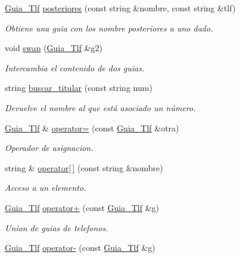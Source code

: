 \begin{DoxyCompactItemize}
\hyperlink{classGuia__Tlf}{Guia\+\_\+\+Tlf} \hyperlink{classGuia__Tlf_a315cfa88a2536ea7e2918cb69503ef66}{posteriores} (const string \&nombre, const string \&tlf)
\begin{DoxyCompactList}\small\item\em Obtiene una guia con los nombre posteriores a uno dado. \end{DoxyCompactList}\item 
void \hyperlink{classGuia__Tlf_a0f7d4a66893e07f44e1471e9b54fd9ee}{swap} (\hyperlink{classGuia__Tlf}{Guia\+\_\+\+Tlf} \&g2)
\begin{DoxyCompactList}\small\item\em Intercambia el contenido de dos guias. \end{DoxyCompactList}\item 
string \hyperlink{classGuia__Tlf_a69d5ad982b44abf190dcdb3b8601e6ef}{buscar\+\_\+titular} (const string num)
\begin{DoxyCompactList}\small\item\em Devuelve el nombre al que está asociado un número. \end{DoxyCompactList}\item 
\hyperlink{classGuia__Tlf}{Guia\+\_\+\+Tlf} \& \hyperlink{classGuia__Tlf_afaeef82d19012aceb68167e3592b2106}{operator=} (const \hyperlink{classGuia__Tlf}{Guia\+\_\+\+Tlf} \&otra)
\begin{DoxyCompactList}\small\item\em Operador de asignacion. \end{DoxyCompactList}\item 
string \& \hyperlink{classGuia__Tlf_a6eed62abe5d13de96934e6897aaf9184}{operator\mbox{[}$\,$\mbox{]}} (const string \&nombre)
\begin{DoxyCompactList}\small\item\em Acceso a un elemento. \end{DoxyCompactList}\item 
\hyperlink{classGuia__Tlf}{Guia\+\_\+\+Tlf} \hyperlink{classGuia__Tlf_a3e0b08a1985d3c72853690730319172f}{operator+} (const \hyperlink{classGuia__Tlf}{Guia\+\_\+\+Tlf} \&g)
\begin{DoxyCompactList}\small\item\em Union de guias de telefonos. \end{DoxyCompactList}\item 
\hyperlink{classGuia__Tlf}{Guia\+\_\+\+Tlf} \hyperlink{classGuia__Tlf_ac381d53f275ce769830e07fbc56902b0}{operator-\/} (const \hyperlink{classGuia__Tlf}{Guia\+\_\+\+Tlf} \&g)

\end{DoxyCompactItemize}
